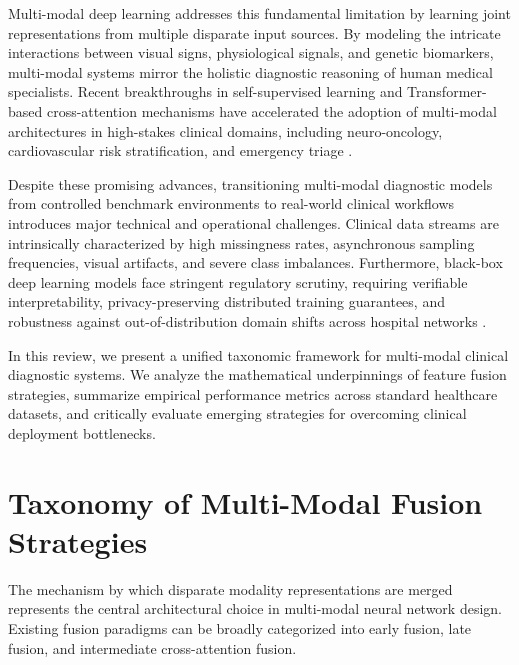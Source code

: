 \documentclass[final,3p,times]{elsarticle}
\begin{document}
Multi-modal deep learning addresses this fundamental limitation by learning joint representations from multiple disparate input sources. By modeling the intricate interactions between visual signs, physiological signals, and genetic biomarkers, multi-modal systems mirror the holistic diagnostic reasoning of human medical specialists. Recent breakthroughs in self-supervised learning and Transformer-based cross-attention mechanisms have accelerated the adoption of multi-modal architectures in high-stakes clinical domains, including neuro-oncology, cardiovascular risk stratification, and emergency triage \cite{chen2025transformer}.

Despite these promising advances, transitioning multi-modal diagnostic models from controlled benchmark environments to real-world clinical workflows introduces major technical and operational challenges. Clinical data streams are intrinsically characterized by high missingness rates, asynchronous sampling frequencies, visual artifacts, and severe class imbalances. Furthermore, black-box deep learning models face stringent regulatory scrutiny, requiring verifiable interpretability, privacy-preserving distributed training guarantees, and robustness against out-of-distribution domain shifts across hospital networks \cite{apex2024framework}.

In this review, we present a unified taxonomic framework for multi-modal clinical diagnostic systems. We analyze the mathematical underpinnings of feature fusion strategies, summarize empirical performance metrics across standard healthcare datasets, and critically evaluate emerging strategies for overcoming clinical deployment bottlenecks.

\section{Taxonomy of Multi-Modal Fusion Strategies}
\label{sec:taxonomy}
The mechanism by which disparate modality representations are merged represents the central architectural choice in multi-modal neural network design. Existing fusion paradigms can be broadly categorized into early fusion, late fusion, and intermediate cross-attention fusion.
\end{document}
